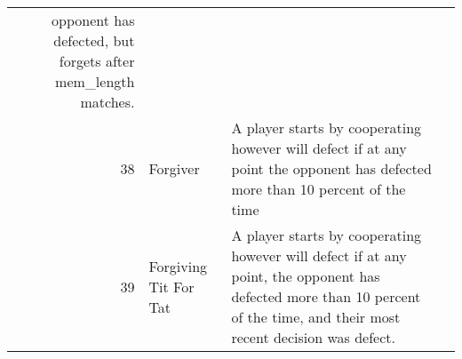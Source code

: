 \begin{table}[H]
\begin{adjustbox}{height=0.7\textwidth, width=1.1\textwidth}
\begin{tabular}{rlll}
	opponent has defected, but forgets after mem\_length matches.                                                                                                                                                                                                                                                                                                                                                                                                                                                                                                                                                                                                                                                                                                                                                                                                                                                                                  \\
	38   & Forgiver                    & A player starts by cooperating however will defect if at any point
	the opponent has defected more than 10 percent of the time                                                                                                                                                                                                                                                                                                                                                                                                                                                                                                                                                                                                                                                                                                                                                                                                                                                                                        \\
	39   & Forgiving Tit For Tat       & A player starts by cooperating however will defect if at any point,
	the opponent has defected more than 10 percent of the time,
	and their most recent decision was defect.                                                                                                                                                                                                                                                                                                                                                                                                                                                                                                                                                                                                                                                                                                                                                                                                                                       \\

\end{tabular}
\end{adjustbox}
\end{table}
